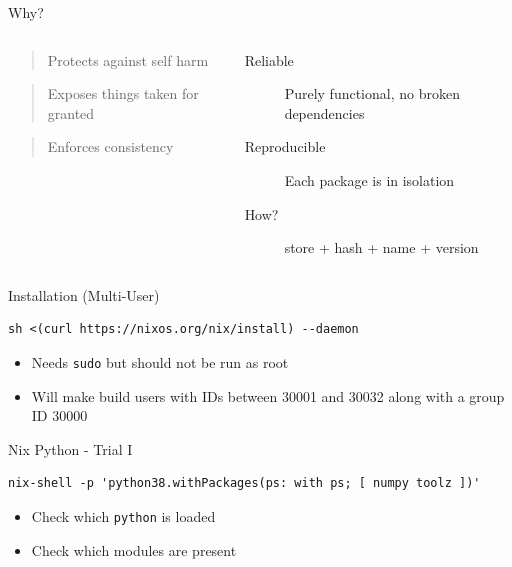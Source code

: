\documentclass[bigger,unknownkeysallowed,aspectratio=169,red,colorblocks]{beamer}
\begin{document}
\begin{frame}[label={sec:org3aee92a}]{Why?}
\begin{columns}
\begin{column}{0.4\columnwidth}
\begin{quote}
Protects against self harm
\end{quote}
\begin{quote}
Exposes things taken for granted
\end{quote}
\begin{quote}
Enforces consistency
\end{quote}
\end{column}
\begin{column}{0.6\columnwidth}
\begin{description}
\item[{Reliable}] Purely functional, no broken dependencies
\item[{Reproducible}] Each package is in isolation
\item[{How?}] store + hash + name + version
\end{description}
\end{column}
\end{columns}
\end{frame}
\begin{frame}[label={sec:orge4c4ebc},fragile]{Installation (Multi-User)}
 \begin{verbatim}
sh <(curl https://nixos.org/nix/install) --daemon
\end{verbatim}

\begin{itemize}
\item Needs \texttt{sudo} but should not be run as root
\item Will make build users with IDs between 30001 and 30032 along with a group ID 30000
\end{itemize}
\end{frame}
\begin{frame}[label={sec:orgff2b6fc},fragile]{Nix Python - Trial I}
 \begin{verbatim}
nix-shell -p 'python38.withPackages(ps: with ps; [ numpy toolz ])'
\end{verbatim}

\begin{itemize}
\item Check which \texttt{python} is loaded
\item Check which modules are present
\end{itemize}
\end{frame}
\end{document}
